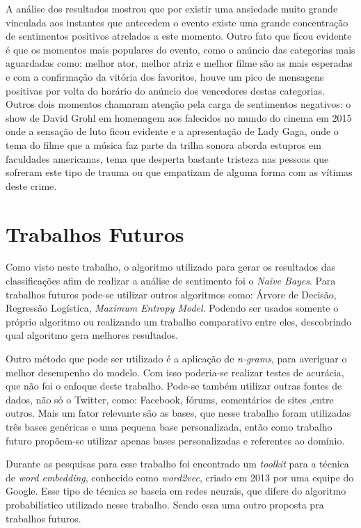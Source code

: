 A análise dos resultados mostrou que por existir uma ansiedade muito grande vinculada aos instantes que antecedem o evento existe uma grande concentração de sentimentos positivos atrelados a este momento. Outro fato que ficou evidente é que os momentos mais populares do evento, como o anúncio das categorias mais aguardadas como: melhor ator, melhor atriz e melhor filme são as mais esperadas e com a confirmação da vitória dos favoritos, houve um pico de mensagens positivas por volta do horário do anúncio dos vencedores destas categorias. Outros dois momentos chamaram atenção pela carga de sentimentos negativos: o show de David Grohl em homenagem aos falecidos no mundo do cinema em 2015 onde a sensação de luto ficou evidente e a apresentação de Lady Gaga, onde o tema do filme que a música  faz parte da trilha sonora aborda estupros em faculdades americanas, tema que desperta bastante tristeza nas pessoas que sofreram este tipo de trauma ou que empatizam de alguma forma com as vítimas deste crime.


\section{Trabalhos Futuros}\label{sec:8_trabfut}

Como visto neste trabalho, o algoritmo utilizado para gerar os resultados das classificações afim de realizar a análise de sentimento foi o \textit{Naive Bayes}. Para trabalhos futuros pode-se utilizar outros algoritmos como: Árvore de Decisão, Regressão Logística, \textit{Maximum Entropy Model}. Podendo ser usados somente o próprio algoritmo ou realizando um trabalho comparativo entre eles, descobrindo qual algoritmo gera melhores resultados.

Outro método que pode ser utilizado é a aplicação de \textit{n-grams}, para averiguar o melhor desempenho do modelo. Com isso poderia-se realizar testes de acurácia, que não foi o enfoque deste trabalho. Pode-se também utilizar outras fontes de dados, não só o Twitter, como: Facebook, fórums, comentários de sites ,entre outros. Mais um fator relevante são as bases, que nesse trabalho foram utilizadas três bases genéricas e uma pequena base personalizada, então como trabalho futuro propõem-se utilizar apenas bases personalizadas e referentes ao domínio.

Durante as pesquisas para esse trabalho foi encontrado um \textit{toolkit}  para a técnica de \textit{word embedding}, conhecido como \textit{word2vec}, criado em 2013 por uma equipe do Google. Esse tipo de técnica se baseia em redes neurais, que difere do algoritmo probabilístico utilizado nesse trabalho. Sendo essa uma outro proposta pra trabalhos futuros.

